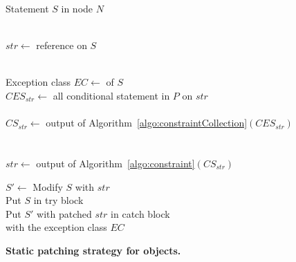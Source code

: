 \begin{algorithm}[t]
\scriptsize
\DontPrintSemicolon
{}
\Begin
{
  {
  Statement $S$ in node $N$\\
   {\\
  	\mytab $str \longleftarrow$  reference on $S$
  	
  	 {\\
  	  \mytab Exception class $EC \longleftarrow$  of
$S$\\
          \mytab $CES_{str} \longleftarrow$ all conditional statement in $P$ on
$str$\\
 \mytab  {}\\
  	  \mytab $CS_{str} \longleftarrow$ output of
Algorithm~\ref{algo:constraintCollection}$(CES_{str})$\\

  		\mytab {} {\\
  		
  		 \mytab  {}\\
  			\mytab \mytab $str \longleftarrow$ output of
Algorithm~\ref{algo:constraint}$(CS_{str})$
  		}
  		
  		\mytab {}
  		
  		
  		\mytab $S'\longleftarrow$ Modify $S$ with $str$ \\
  		\mytab Put $S$ in try block\\
  		\mytab Put $S'$ with patched $str$ in catch block \\
  		\mytab with the exception class $EC$	
    }
    \vspace{-2em}
  }
 }
}
\caption{\bf Static patching strategy for  objects.}
\label{algo:patchingStrategy}
\end{algorithm}

